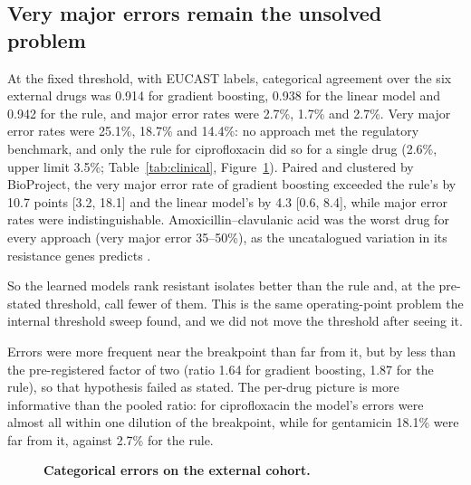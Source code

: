 \subsection*{Very major errors remain the unsolved problem}

At the fixed threshold, with EUCAST labels, categorical agreement over the six external drugs was
0.914 for gradient boosting, 0.938 for the linear model and 0.942 for the rule, and major error
rates were 2.7\%, 1.7\% and 2.7\%. Very major error rates were 25.1\%, 18.7\% and 14.4\%: no
approach met the regulatory benchmark, and only the rule for ciprofloxacin did so for a single drug
(2.6\%, upper limit 3.5\%; Table~\ref{tab:clinical}, Figure~\ref{fig:clinical}). Paired and
clustered by BioProject, the very major error rate of gradient boosting exceeded the rule's by 10.7
points [3.2, 18.1] and the linear model's by 4.3 [0.6, 8.4], while major error rates were
indistinguishable. Amoxicillin--clavulanic acid was the worst drug for every approach (very major
error 35--50\%), as the uncatalogued variation in its resistance genes predicts
\cite{lipworth2024uncatalogued}.

So the learned models rank resistant isolates better than the rule and, at the pre-stated
threshold, call fewer of them. This is the same operating-point problem the internal threshold sweep
found, and we did not move the threshold after seeing it.

Errors were more frequent near the breakpoint than far from it, but by less than the pre-registered
factor of two (ratio 1.64 for gradient boosting, 1.87 for the rule), so that hypothesis failed as
stated. The per-drug picture is more informative than the pooled ratio: for ciprofloxacin the
model's errors were almost all within one dilution of the breakpoint, while for gentamicin 18.1\%
were far from it, against 2.7\% for the rule.

\begin{figure}[t]\centering
{}
\caption{\textbf{Categorical errors on the external cohort.} }\label{fig:clinical}
\end{figure}
